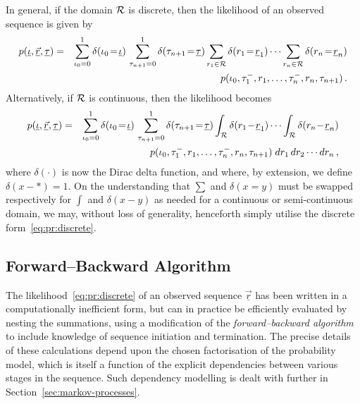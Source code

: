 \documentclass[a4paper]{article}
\newcommand{\ui}{\underline{\iota}}
\newcommand{\ut}{\underline{\tau}}
\newcommand{\ur}{\underline{r}}
\newcommand{\vr}{\vec{r}}
\newcommand{\uvr}{\underline{\vr}}
\newcommand{\tm}{\tau^{-}}
\begin{document}
In general, if the domain ${\cal R}$  is discrete, then the likelihood of an observed sequence is given by
\begin{eqnarray}
p(\ui,\uvr,\ut) 
& = & 
\sum_{\iota_0=0}^{1}\delta(\iota_0\!=\!\ui)
\,\sum_{\tau_{n+1}=0}^{1}\delta(\tau_{n+1}\!=\!\ut)
\sum_{r_1\in{\cal R}} \delta(r_1\!=\!\ur_1)
\cdots\sum_{r_n\in{\cal R}} \delta(r_n\!=\!\ur_n)
\nonumber\\
&& \hspace*{5mm}
p(\iota_0,\tm_1,r_1,\ldots,\tm_n,r_n,\tau_{n+1})\,.
\label{eq:pr:discrete}
\end{eqnarray}
Alternatively, if ${\cal R}$ is continuous, then the likelihood becomes
\begin{eqnarray}
p(\ui,\uvr,\ut) 
& = & 
\sum_{\iota_0=0}^{1}\delta(\iota_0\!=\!\ui)
\,\sum_{\tau_{n+1}=0}^{1}\delta(\tau_{n+1}\!=\!\ut)
\int_{{\cal R}} \delta(r_1\!-\!\ur_1)
\cdots\int_{{\cal R}} \delta(r_n\!-\!\ur_n)
\nonumber\\
&& \hspace*{5mm}
p(\iota_0,\tm_1,r_1,\ldots,\tm_n,r_n,\tau_{n+1})
\;dr_1\,dr_2\cdots dr_n
\,,
\end{eqnarray}
where $\delta(\cdot)$ is now the Dirac delta function, and where, by extension, we define $\delta(x-*)=1$.
On the understanding that $\sum$ and $\delta(x\!=\!y)$ must be swapped respectively for $\int$ and $\delta(x\!-\!y)$ as needed for a continuous 
or semi-continuous domain, we may, without loss of generality, henceforth simply utilise the discrete form~\eqref{eq:pr:discrete}.

\subsection{Forward--Backward Algorithm}
\label{sec:forward-backward-basic}

The likelihood~\eqref{eq:pr:discrete} of an observed sequence $\uvr$ has been written in a computationally inefficient form,
but can in practice be efficiently evaluated by nesting the summations, using a modification of the {\em forward--backward algorithm} to include knowledge of
sequence initiation and termination.
The precise details of these calculations depend upon the chosen factorisation of the probability model, which is itself a function of
the explicit dependencies between various stages in the sequence. Such dependency modelling is dealt with further in Section~\ref{sec:markov-processes}.
\end{document}
